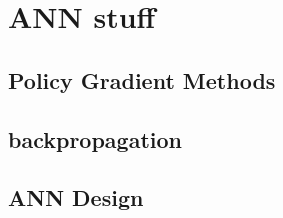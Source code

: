 \chapter{ANN stuff}
\section{Policy Gradient Methods}
\section{backpropagation}
\section{ANN Design}